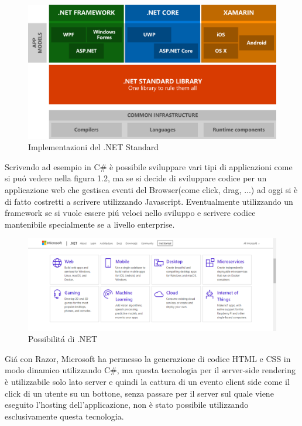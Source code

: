 \begin{figure}[H]
	\centerline{\includegraphics[scale=0.2]{figure/DotNetImplementations}}
	\caption{Implementazioni del .NET Standard}
	\label{fig:DotNetImplementations}
\end{figure}

Scrivendo ad esempio in C\# \`e possibile sviluppare vari tipi di applicazioni come si pu\'o vedere nella figura 1.2, ma se si decide di sviluppare codice per un applicazione web che gestisca eventi del Browser(come click, drag, ...) ad oggi si \`e di fatto costretti a scrivere utilizzando Javascript.
Eventualmente utilizzando un framework se si vuole essere pi\'u veloci nello sviluppo e scrivere codice mantenibile specialmente se a livello enterprise.

\begin{figure}[H]
\centerline{\includegraphics[scale=0.35]{figure/DotNetFrameworkCapabilities}}
\caption{Possibilit\'a di .NET}
\label{fig:DotNetCapabilities}
\end{figure}

Gi\'a con Razor\cite{razor}, Microsoft ha permesso la generazione di codice HTML e CSS in modo dinamico utilizzando C\#, ma questa tecnologia per il server-side rendering \`e utilizzabile solo lato server e quindi la cattura di un evento client side come il click di un utente su un bottone, senza passare per il server sul quale viene eseguito l'hosting dell'applicazione, non \`e stato possibile utilizzando esclusivamente questa tecnologia.

